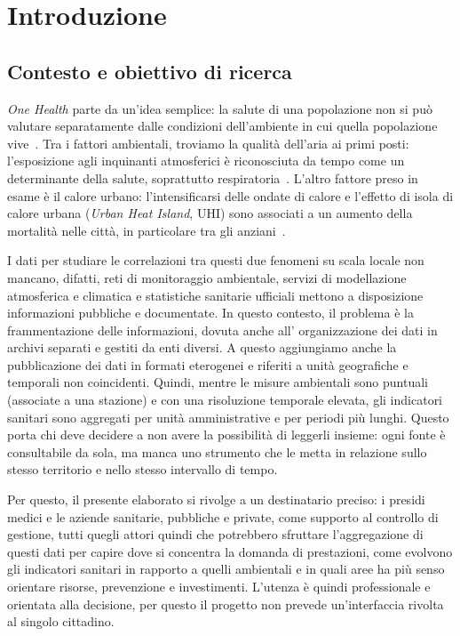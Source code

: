 \chapter{Introduzione}
\label{cap:introduzione}

\section{Contesto e obiettivo di ricerca}
\label{sec:intro-contesto}

\emph{One Health} parte da un'idea semplice: la salute di una popolazione non si può valutare separatamente dalle condizioni dell'ambiente in cui quella popolazione vive~\cite{ohhlep2022,salgado2020}. Tra i fattori ambientali, troviamo la qualità dell'aria ai primi posti: l'esposizione agli inquinanti atmosferici è riconosciuta da tempo come un determinante della salute, soprattutto respiratoria~\cite{hamanaka2025}. L'altro fattore preso in esame è il calore urbano: l'intensificarsi delle ondate di calore e l'effetto di isola di calore urbana (\emph{Urban Heat Island}, UHI) sono associati a un aumento della mortalità nelle città, in particolare tra gli anziani~\cite{iungman2023,huang2023}. 

I dati per studiare le correlazioni tra questi due fenomeni su scala locale non mancano, difatti, reti di monitoraggio ambientale, servizi di modellazione atmosferica e climatica e statistiche sanitarie ufficiali mettono a disposizione informazioni pubbliche e documentate. In questo contesto, il problema è la frammentazione delle informazioni, dovuta anche all' organizzazione dei dati in archivi separati e gestiti da enti diversi. A questo aggiungiamo anche la pubblicazione dei dati in formati eterogenei e riferiti a unità geografiche e temporali non coincidenti.
Quindi, mentre le misure ambientali sono puntuali (associate a una stazione) e con una risoluzione temporale elevata, gli indicatori sanitari sono aggregati per unità amministrative e per periodi più lunghi. Questo porta chi deve decidere a non avere la possibilità di leggerli insieme: ogni fonte è consultabile da sola, ma manca uno strumento che le metta in relazione sullo stesso territorio e nello stesso intervallo di tempo.

Per questo, il presente elaborato si rivolge a un destinatario preciso: i presidi medici e le aziende sanitarie, pubbliche e private, come supporto al controllo di gestione, tutti quegli attori quindi che potrebbero sfruttare l'aggregazione di questi dati per capire dove si concentra la domanda di prestazioni, come evolvono gli indicatori sanitari in rapporto a quelli ambientali e in quali aree ha più senso orientare risorse, prevenzione e investimenti. L'utenza è quindi professionale e orientata alla decisione, per questo il progetto non prevede un'interfaccia rivolta al singolo cittadino.

